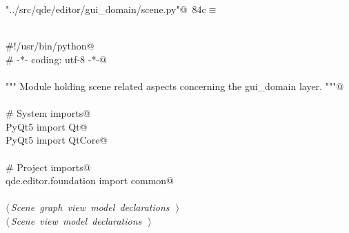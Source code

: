 \documentclass[
    a4paper,      %
    10pt,         %
    openright,    %
    notitlepage,  %
    parskip=half, %
]{scrreprt}       %
\theoremstyle{definition}                    %
\begin{document}
\begin{flushleft} \small
\begin{minipage}{\linewidth}\label{scrap137}\raggedright\small
{} \verb@"../src/qde/editor/gui_domain/scene.py"@\nobreak\ {\footnotesize {84c}}$\equiv$
\vspace{-1ex}
\begin{list}{}{} \item
\mbox{}\lstinline@@\\
\mbox{}\lstinline@#!/usr/bin/python@\\
\mbox{}\lstinline@# -*- coding: utf-8 -*-@\\
\mbox{}\lstinline@@\\
\mbox{}\lstinline@""" Module holding scene related aspects concerning the gui_domain layer. """@\\
\mbox{}\lstinline@@\\
\mbox{}\lstinline@# System imports@\\
\mbox{}\lstinline@from PyQt5 import Qt@\\
\mbox{}\lstinline@from PyQt5 import QtCore@\\
\mbox{}\lstinline@@\\
\mbox{}\lstinline@# Project imports@\\
\mbox{}\lstinline@from qde.editor.foundation import common@\\
\mbox{}\lstinline@@\\
\mbox{}\lstinline@@\hbox{$\langle\,${\itshape Scene graph view model declarations}\nobreak\ {\footnotesize {}}$\,\rangle$}\lstinline@@\\
\mbox{}\lstinline@@\hbox{$\langle\,${\itshape Scene view model declarations}\nobreak\ {\footnotesize {}}$\,\rangle$}\lstinline@@\\
\mbox{}\lstinline@@{\NWsep}
\end{list}
\vspace{-1.5ex}
\footnotesize
\begin{list}{}{\setlength{\itemsep}{-\parsep}\setlength{\itemindent}{-\leftmargin}}

\item{}
\end{list}
\end{minipage}\vspace{4ex}
\end{flushleft}
\end{document}
